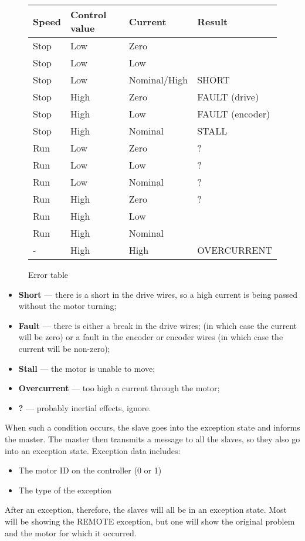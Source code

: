 \begin{center}
\end{center}


\begin{figure}[ht]
\center
\begin{tabular}{|l|l|l|l|}\hline
Speed & Control value & Current & Result \\ \hline
Stop & Low & Zero & \\
Stop & Low & Low & \\
Stop & Low & Nominal/High & SHORT\\
Stop & High & Zero &  FAULT (drive)\\
Stop & High & Low &  FAULT (encoder)\\
Stop & High & Nominal & STALL \\
Run & Low & Zero & ? \\
Run & Low & Low & ? \\
Run & Low & Nominal & ? \\
Run & High & Zero & ? \\
Run & High & Low &  \\
Run & High & Nominal &  \\ 
- & High & High & OVERCURRENT\\ \hline
\end{tabular}
\caption{Error table}
\label{errorstatestab}
\end{figure}
\begin{itemize}
\item \textbf{Short} --- there is a short in the drive wires, so a high
current is being passed without the motor turning;
\item \textbf{Fault} --- there is either a break in the drive wires;
(in which case the current will be zero) or a fault in the encoder or
encoder wires (in which case the current will be non-zero);
\item \textbf{Stall} --- the motor is unable to move;
\item \textbf{Overcurrent} --- too high a current through the motor;
\item \textbf{?} --- probably inertial effects, ignore.
\end{itemize}
When such a condition occurs, the slave goes into the exception state
and informs the master. The master then transmits a message to all the
slaves, so they also go into an exception state. Exception data includes:
\begin{itemize}
\item The motor ID on the controller (0 or 1)
\item The type of the exception
\end{itemize}
After an exception, therefore, the slaves will all be in an exception state.
Most will be showing the REMOTE exception, but one will show the
original problem and the motor for which it occurred.

